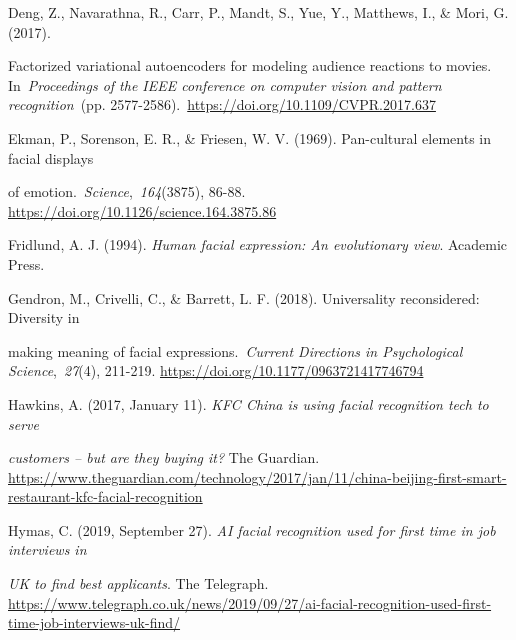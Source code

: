 \documentclass[authordate, empirical]{jote-new-article}
\begin{document}
	Deng, Z., Navarathna, R., Carr, P., Mandt, S., Yue, Y., Matthews, I., \& Mori, G. (2017).



	Factorized variational autoencoders for modeling audience reactions to movies. In \emph{Proceedings of the IEEE conference on computer vision and pattern recognition} (pp. 2577-2586). \href{https://doi.org/10.1109/CVPR.2017.637}{https://doi.org/10.1109/CVPR.2017.637}



	Ekman, P., Sorenson, E. R., \& Friesen, W. V. (1969). Pan-cultural elements in facial displays



	of emotion. \emph{Science}, \emph{164}(3875), 86-88. \href{https://doi.org/10.1126/science.164.3875.86}{https://doi.org/10.1126/science.164.3875.86}



	Fridlund, A. J. (1994). \emph{Human facial expression: An evolutionary view}. Academic Press.



	Gendron, M., Crivelli, C., \& Barrett, L. F. (2018). Universality reconsidered: Diversity in



	making meaning of facial expressions. \emph{Current Directions in Psychological Science}, \emph{27}(4), 211-219. \href{https://doi.org/10.1177/0963721417746794}{https://doi.org/10.1177/0963721417746794}



	Hawkins, A. (2017, January 11). \emph{KFC China is using facial recognition tech to serve }



	\emph{customers -- but are they buying it?} The Guardian. \href{https://www.theguardian.com/technology/2017/jan/11/china-beijing-first-smart-restaurant-kfc-facial-recognition}{https://www.theguardian.com/technology/2017/jan/11/china-beijing-first-smart-restaurant-kfc-facial-recognition}



	Hymas, C. (2019, September 27). \emph{AI facial recognition used for first time in job interviews in }



	\emph{UK to find best applicants}. The Telegraph. \href{https://www.telegraph.co.uk/news/2019/09/27/ai-facial-recognition-used-first-time-job-interviews-uk-find/}{https://www.telegraph.co.uk/news/2019/09/27/ai-facial-recognition-used-first-time-job-interviews-uk-find/}
\end{document}
